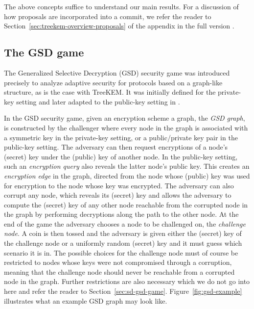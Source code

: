 The above concepts suffice to understand our main results. For a discussion of how proposals are incorporated into a commit, we refer the reader to Section~\ref*{sec:treekem-overview-proposals} of the appendix in the full version \cite{full-version}.

\subsection{The GSD game} \label{sec:gsd-intro}

The Generalized Selective Decryption (GSD) security game \cite{gsd} was introduced precisely to analyze adaptive security for protocols based on a graph-like structure, as is the case with TreeKEM. It was initially defined for the private-key setting and later adapted to the public-key setting in \cite{ttkem}.

In the GSD security game, given an encryption scheme a graph, the \emph{GSD graph}, is constructed by the challenger where every node in the graph is associated with a symmetric key in the private-key setting, or a public/private key pair in the public-key setting. The adversary can then request encryptions of a node's (secret) key under the (public) key of another node. In the public-key setting, such an \emph{encryption query} also reveals the latter node's public key. This creates an \emph{encryption edge} in the graph, directed from the node whose (public) key was used for encryption to the node whose key was encrypted. The adversary can also corrupt any node, which reveals its (secret) key and allows the adversary to compute the (secret) key of any other node reachable from the corrupted node in the graph by performing decryptions along the path to the other node. At the end of the game the adversary chooses a node to be challenged on, the \emph{challenge node}. A coin is then tossed and the adversary is given either the (secret) key of the challenge node or a uniformly random (secret) key and it must guess which scenario it is in. The possible choices for the challenge node must of course be restricted to nodes whose keys were not compromised through a corruption, meaning that the challenge node should never be reachable from a corrupted node in the graph. Further restrictions are also necessary which we do not go into here and refer the reader to Section~\ref{sec:sd-gsd-game}. Figure~\ref{fig:gsd-example} illustrates what an example GSD graph may look like.

